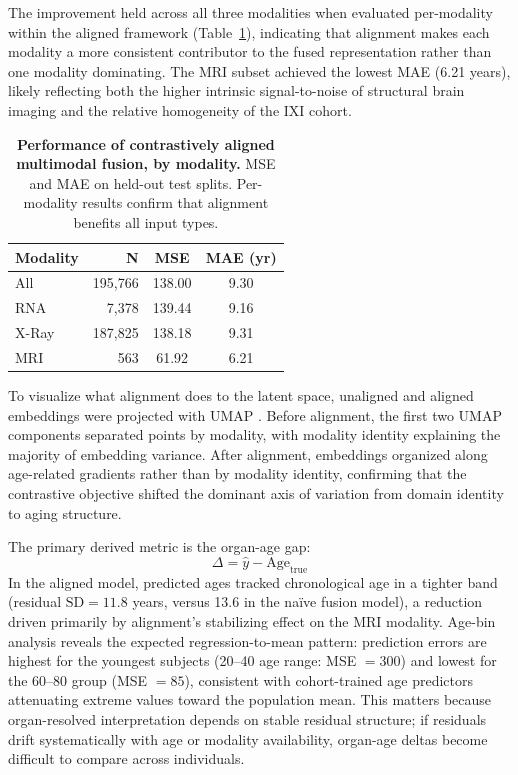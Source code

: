 \documentclass[10pt,twocolumn]{article}
\begin{document}
The improvement held across all three modalities when evaluated per-modality within the aligned
framework (Table~\ref{tab:per_modality}), indicating that alignment makes each modality a more
consistent contributor to the fused representation rather than one modality dominating. The MRI
subset achieved the lowest MAE (6.21 years), likely reflecting both the higher intrinsic
signal-to-noise of structural brain imaging and the relative homogeneity of the IXI cohort.

\begin{table}[t]
\centering
\caption{
\textbf{Performance of contrastively aligned multimodal fusion, by modality.}
MSE and MAE on held-out test splits. Per-modality results confirm that alignment benefits all
input types.
}
\begin{tabular}{lrcc}
\toprule
\textbf{Modality} & \textbf{N} & \textbf{MSE} & \textbf{MAE (yr)} \\
\midrule
All    & 195,766 & 138.00 & 9.30 \\
RNA    &   7,378 & 139.44 & 9.16 \\
X-Ray  & 187,825 & 138.18 & 9.31 \\
MRI    &     563 &  61.92 & 6.21 \\
\bottomrule
\end{tabular}
\label{tab:per_modality}
\end{table}

To visualize what alignment does to the latent space, unaligned and aligned embeddings were projected
with UMAP \cite{mcinnes2018umap}. Before alignment, the first two UMAP components separated
points by modality, with modality identity explaining the majority of embedding variance. After
alignment, embeddings organized along age-related gradients rather than by modality identity,
confirming that the contrastive objective shifted the dominant axis of variation from domain
identity to aging structure.

The primary derived metric is the organ-age gap:
\begin{equation}
\Delta = \hat{y} - \mathrm{Age}_{\text{true}}
\label{eq:agegap}
\end{equation}
In the aligned model, predicted ages tracked chronological age in a tighter band (residual
$\mathrm{SD} = 11.8$ years, versus 13.6 in the na\"ive fusion model), a reduction driven
primarily by alignment's stabilizing effect on the MRI modality. Age-bin analysis reveals
the expected regression-to-mean pattern: prediction errors are highest for the youngest
subjects (20--40 age range: MSE $= 300$) and lowest for the 60--80 group (MSE $= 85$),
consistent with cohort-trained age predictors attenuating extreme values toward the population
mean. This matters because organ-resolved interpretation depends on stable residual structure;
if residuals drift systematically with age or modality availability, organ-age deltas become
difficult to compare across individuals.
\end{document}
